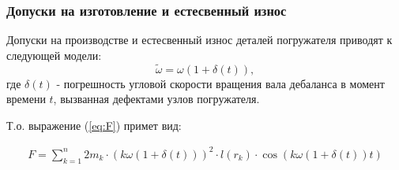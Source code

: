 \documentclass{beamer}
\begin{document}
    \begin{frame}
        \frametitle{Допуски на изготовление и естесвенный износ}

        Допуски на производстве и естесвенный износ деталей погружателя приводят к следующей модели:
        \begin{equation}
            \widetilde{\omega} = \omega (1 + \delta(t)),
        \end{equation}
        где $\delta(t)$ - погрешность угловой скорости вращения вала дебаланса в момент времени $t$, вызванная дефектами узлов погружателя.

        Т.о. выражение (\ref{eq:F}) примет вид:

        \begin{equation}
            \label{eq:F_noise}
            \begin{gathered}
                F = \sum\limits_{k = 1}^n 2 m_k \cdot (k \omega (1 + \delta(t)))^2 \cdot l(r_k) \cdot \cos (k \omega (1 + \delta(t)) t)
            \end{gathered}
        \end{equation}
    \end{frame}
\end{document}
